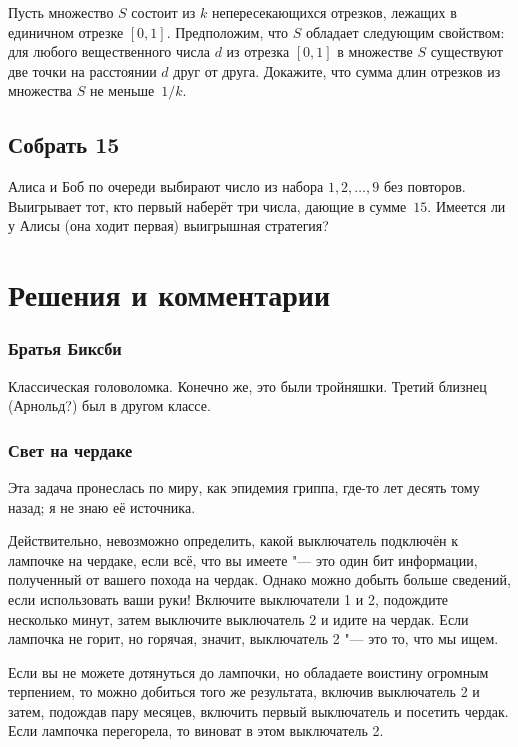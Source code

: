 \documentclass[twoside]{book}
\makeatletter
\newcommand{\rindex}[2][\imki@jobname]{%
\index[#1]{\detokenize{#2}}%
}
\makeatother
\begin{document}
Пусть множество $S$ состоит из $k$ непересекающихся отрезков, лежащих в единичном отрезке $[0,1]$.
Предположим, что $S$ обладает следующим свойством: для любого вещественного числа $d$ из отрезка $[0,1]$ в множестве $S$ существуют две точки на расстоянии $d$ друг от друга.
Докажите, что сумма длин отрезков из множества $S$ не меньше~$1/k$.

\subsection*{Собрать 15} %
\rindex{Собрать 15}

Алиса и Боб по очереди выбирают число из набора $1, 2,\dots,9$ без повторов.
Выигрывает тот, кто первый наберёт три числа, дающие в сумме~$15$.
Имеется ли у Алисы (она ходит первая)
выигрышная стратегия?


\section*{Решения и комментарии}

\subsubsection*{Братья Биксби} %

Классическая головоломка.
Конечно же, это были тройняшки.
Третий близнец (Арнольд?) был в другом классе.

\subsubsection*{Свет на чердаке} %

Эта задача пронеслась по миру, как эпидемия гриппа, где-то лет десять тому назад;
я не знаю её источника.

\medskip

Действительно, невозможно определить, какой выключатель подключён к лампочке на чердаке, если всё, что вы имеете "--- это один бит информации, полученный от вашего похода на чердак.
Однако можно добыть больше сведений, если использовать ваши руки!
Включите выключатели 1 и 2, подождите несколько минут, затем выключите выключатель 2 и идите на чердак.
Если лампочка не горит, но горячая, значит, выключатель 2 "--- это то, что мы ищем.
\heart

\medskip
Если вы не можете дотянуться до лампочки, но обладаете воистину
огромным терпением, то можно добиться того же результата, включив
выключатель 2 и затем, подождав пару месяцев, включить первый
выключатель и посетить чердак.
Если лампочка перегорела, то виноват в
этом выключатель 2.
\end{document}
